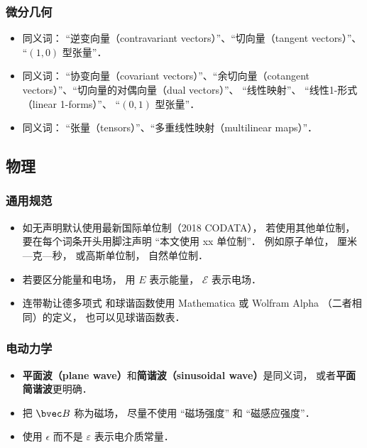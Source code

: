 \subsubsection{微分几何}
\begin{itemize}
\item 同义词： “逆变向量（contravariant vectors）”、“切向量（tangent vectors）”、 “$(1, 0)$ 型张量”．
\item 同义词： “协变向量（covariant vectors）”、“余切向量（cotangent vectors）”、“切向量的对偶向量（dual vectors）”、 “线性映射”、 “线性1-形式（linear 1-forms）”、 “$(0, 1)$ 型张量”．
\item 同义词： “张量（tensors）”、“多重线性映射（multilinear maps）”．
\end{itemize}

\subsection{物理}
\subsubsection{通用规范}
\begin{itemize}
\item 如无声明默认使用最新国际单位制（2018 CODATA）， 若使用其他单位制， 要在每个词条开头用脚注声明 “本文使用 xx 单位制”． 例如原子单位， 厘米—克—秒， 或高斯单位制， 自然单位制．
\item 若要区分能量和电场， 用 $E$ 表示能量， $\mathcal E$ 表示电场．
\item 连带勒让德多项式 和球谐函数使用 Mathematica 或 Wolfram Alpha （二者相同）的定义， 也可以见球谐函数表．
\end{itemize}

\subsubsection{电动力学}
\begin{itemize}
\item \textbf{平面波（plane wave）}和\textbf{简谐波（sinusoidal wave）}是同义词， 或者\textbf{平面简谐波}更明确．
\item 把 $\bvec B$ 称为磁场， 尽量不使用 “磁场强度” 和 “磁感应强度”．
\item 使用 $\epsilon$ 而不是 $\varepsilon$ 表示电介质常量．
\end{itemize}

